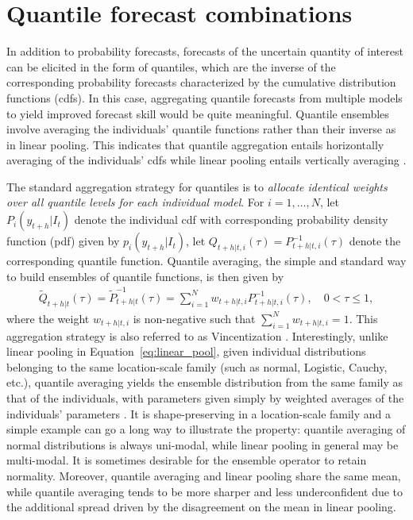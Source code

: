 \documentclass[11pt]{article}
\newcommand{\pkg}[1]{{\normalfont\fontseries{b}\selectfont #1}}
\let\proglang=\textsf
\begin{document}

\section{Quantile forecast combinations}
\label{sec:quantile_forecast_ensembles}

In addition to probability forecasts, forecasts of the uncertain quantity of interest can be elicited in the form of quantiles, which are the inverse of the corresponding probability forecasts characterized by the cumulative distribution functions (cdfs). In this case, aggregating quantile forecasts from multiple models to yield improved forecast skill would be quite meaningful. Quantile ensembles involve averaging the individuals' quantile functions rather than their inverse as in linear pooling. This indicates that quantile aggregation entails horizontally averaging of the individuals' cdfs while linear pooling entails vertically averaging \citep{Lichtendahl2013-rt}.

The standard aggregation strategy for quantiles is to \textit{allocate identical weights over all quantile levels for each individual model}. For $i=1,\ldots,N$, let $P_{i}(y_{t+h}|I_{t})$ denote the individual cdf with corresponding probability density function (pdf) given by $p_{i}(y_{t+h}|I_{t})$, let $Q_{t+h|t,i}(\tau) = P_{t+h|t,i}^{-1}(\tau)$ denote the corresponding quantile function. Quantile averaging, the simple and standard way to build ensembles of quantile functions, is then given by
\begin{align}
\label{eq:quantile_avg}
\tilde{Q}_{t+h|t}(\tau) = \tilde{P}_{t+h|t}^{-1}(\tau) = \sum_{i=1}^{N} w_{t+h|t,i} P_{t+h|t,i}^{-1}(\tau), \quad 0 < \tau \leq 1,
\end{align}
where the weight $w_{t+h|t,i}$ is non-negative such that $\sum_{i=1}^{N}w_{t+h|t,i}=1$. This aggregation strategy is also referred to as Vincentization \citep{vincent1912-fu}. Interestingly, unlike linear pooling in Equation~\eqref{eq:linear_pool}, given individual distributions belonging to the same location-scale family (such as normal, Logistic, Cauchy, etc.), quantile averaging yields the ensemble distribution from the same family as that of the individuals, with parameters given simply by weighted averages of the individuals' parameters \citep{Ratcliff1979-cb,Thomas1980-lp}. It is shape-preserving in a location-scale family and a simple example can go a long way to illustrate the property: quantile averaging of normal distributions is always uni-modal, while linear pooling in general may be multi-modal. It is sometimes desirable for the ensemble operator to retain normality. Moreover, quantile averaging and linear pooling share the same mean, while quantile averaging tends to be more sharper and less underconfident due to the additional spread driven by the disagreement on the mean in linear pooling.
\end{document}
